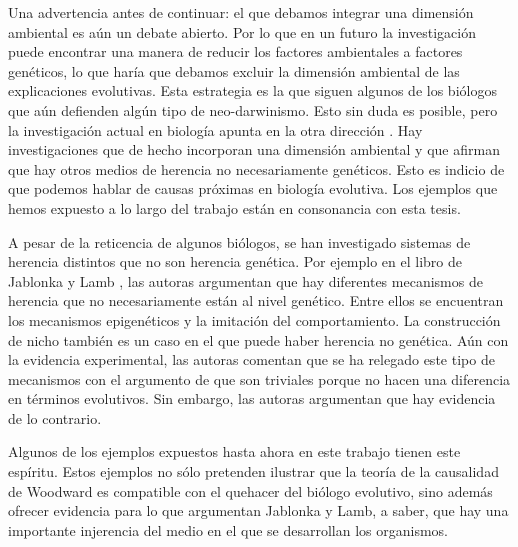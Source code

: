 Una advertencia antes de continuar: el que debamos integrar una dimensión ambiental es aún un debate abierto. Por lo que en un futuro la investigación puede encontrar una manera de reducir los factores ambientales a factores genéticos, lo que haría que debamos excluir la dimensión ambiental de las explicaciones evolutivas. Esta estrategia es la que siguen algunos de los biólogos que aún defienden algún tipo de neo-darwinismo. Esto sin duda es posible, pero la investigación actual en biología apunta en la otra dirección  \cite{Bateson2014}. Hay investigaciones que de hecho incorporan una dimensión ambiental y que afirman que hay otros medios de herencia no necesariamente genéticos. Esto es indicio de que podemos hablar de causas próximas en biología evolutiva. Los ejemplos que hemos expuesto a lo largo del trabajo están en consonancia con esta tesis.

A pesar de la reticencia de algunos biólogos, se han investigado sistemas de herencia distintos que no son herencia genética. Por ejemplo en el libro de Jablonka y Lamb \citeyear{Jablonka2020}, las autoras argumentan que hay diferentes mecanismos de herencia que no necesariamente están al nivel genético. Entre ellos se encuentran los mecanismos epigenéticos y la imitación del comportamiento. La construcción de nicho también es un caso en el que puede haber herencia no genética. Aún con la evidencia experimental, las autoras comentan que se ha relegado este tipo de mecanismos con el argumento de que son triviales porque no hacen una diferencia en términos evolutivos. Sin embargo, las autoras argumentan que hay evidencia de lo contrario.

Algunos de los ejemplos expuestos hasta ahora en este trabajo tienen este espíritu. Estos ejemplos no sólo pretenden ilustrar que la teoría de la causalidad de Woodward es compatible con el quehacer del biólogo evolutivo, sino además ofrecer evidencia para lo que argumentan Jablonka y Lamb, a saber, que hay una importante injerencia del medio en el que se desarrollan los organismos.

